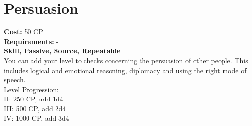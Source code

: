 \section{Persuasion}
\textbf{Cost:} 50 CP\\
\textbf{Requirements:} -\\
\textbf{Skill, Passive, Source, Repeatable}\\
You can add your level to checks concerning the persuasion of other people. This includes logical and emotional reasoning, diplomacy and using the right mode of speech.
\\
Level Progression:\\
II: 250 CP, add 1d4\\
III: 500 CP, add 2d4\\
IV: 1000 CP, add 3d4\\